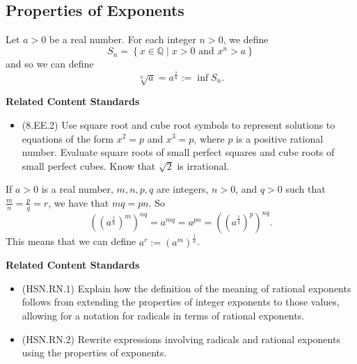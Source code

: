 \documentclass[
]{book}
\providecommand{\tightlist}{%
  \setlength{\itemsep}{0pt}\setlength{\parskip}{0pt}}
\newenvironment{standards}{}{}
\theoremstyle{definition}
\theoremstyle{definition}
\theoremstyle{definition}
\theoremstyle{definition}
\theoremstyle{remark}
\begin{document}
\hypertarget{subsec:real-exponents}{%
\subsection{Properties of Exponents}\label{subsec:real-exponents}}

Let \(a>0\) be a real number. For each integer \(n>0\), we define \[S_n= \left\{ x\in \mathbb{Q}\middle \vert x>0 \mbox{ and } x^n>a\right\}\] and so we can define \[\sqrt[n]{a}=a^{\frac{1}{n}} := \inf S_n.\]

\begin{standards}

\begin{center}
\textbf{Related Content Standards}

\end{center}

\begin{itemize}
\tightlist
\item
  (8.EE.2) Use square root and cube root symbols to represent solutions to equations of the form \(x^2=p\) and \(x^3=p\), where \(p\) is a positive rational number. Evaluate square roots of small perfect squares and cube roots of small perfect cubes. Know that \(\sqrt{2}\) is irrational.\\
\end{itemize}

\end{standards}

If \(a>0\) is a real number, \(m,n,p,q\) are integers, \(n>0\), and \(q>0\) such that \(\frac{m}{n}=\frac{p}{q}=r\), we have that \(mq=pn\). So \[\left(\left(a^{\frac{1}{n}}\right)^m\right)^{nq} = a^{mq} = a^{pn} = \left( \left( a^{\frac{1}{q}} \right)^p \right)^{nq}.\] This means that we can define \(a^r:=\left(a^m\right)^{\frac{1}{n}}\).

\begin{standards}

\begin{center}
\textbf{Related Content Standards}

\end{center}

\begin{itemize}
\tightlist
\item
  (HSN.RN.1) Explain how the definition of the meaning of rational exponents follows from extending the properties of integer exponents to those values, allowing for a notation for radicals in terms of rational exponents.
\item
  (HSN.RN.2) Rewrite expressions involving radicals and rational exponents using the properties of exponents.\\
\end{itemize}

\end{standards}
\end{document}
